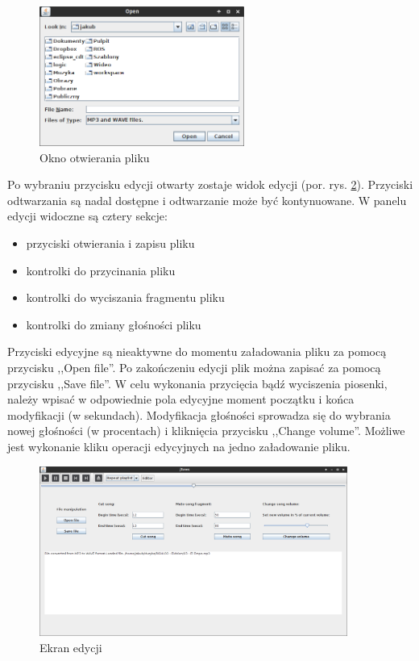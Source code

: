 \documentclass[12pt,a4paper,notitlepage]{article}
\begin{document}
\begin{figure}[H]
 \centering
 \includegraphics[width=0.6\textwidth]{img/open.png}
 \caption{Okno otwierania pliku}
 \label{fig:open}
\end{figure}

Po wybraniu przycisku edycji otwarty zostaje widok edycji (por. rys. \ref{fig:editor}). Przyciski odtwarzania są nadal dostępne i odtwarzanie może być kontynuowane. W panelu edycji widoczne
są cztery sekcje:
\begin{itemize}
 \item przyciski otwierania i zapisu pliku
 \item kontrolki do przycinania pliku
 \item kontrolki do wyciszania fragmentu pliku
 \item kontrolki do zmiany głośności pliku
\end{itemize}

Przyciski edycyjne są nieaktywne do momentu załadowania pliku za pomocą przycisku ,,Open file''. Po zakończeniu edycji plik można zapisać za pomocą przycisku ,,Save file''. 
W celu wykonania przycięcia bądź wyciszenia piosenki, należy wpisać w odpowiednie pola edycyjne moment początku i końca modyfikacji (w sekundach). Modyfikacja głośności sprowadza się do 
wybrania nowej głośności (w procentach) i kliknięcia przycisku ,,Change volume''. Możliwe jest wykonanie kliku operacji edycyjnych na jedno załadowanie pliku.

\begin{figure}[H]
 \centering
 \includegraphics[width=0.9\textwidth]{img/editor.png}
 \caption{Ekran edycji}
 \label{fig:editor}
\end{figure}
\end{document}
